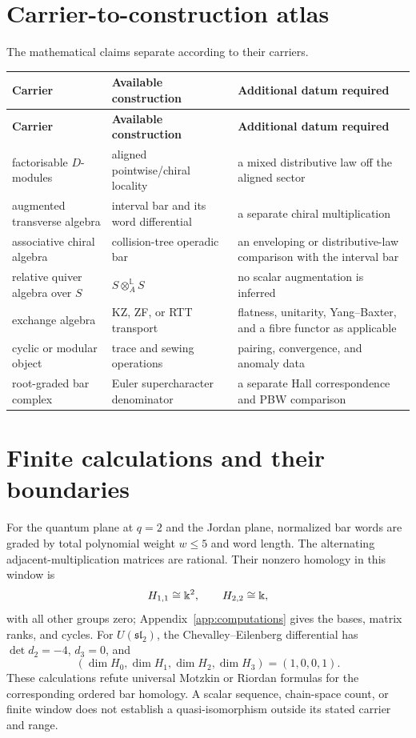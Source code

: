 \section{Carrier-to-construction atlas}
The mathematical claims separate according to their carriers.
\begin{longtable}{p{}p{}p{}}
\toprule
\textbf{Carrier} & \textbf{Available construction} & \textbf{Additional datum required}\\
\midrule
\endfirsthead
\toprule
\textbf{Carrier} & \textbf{Available construction} & \textbf{Additional datum required}\\
\midrule
\endhead
factorisable \(D\)-modules & aligned pointwise/chiral locality & a mixed distributive law off the aligned sector\\
augmented transverse algebra & interval bar and its word differential & a separate chiral multiplication\\
associative chiral algebra & collision-tree operadic bar & an enveloping or distributive-law comparison with the interval bar\\
relative quiver algebra over \(S\) & \(S\otimes_A^{\mathbb L}S\) & no scalar augmentation is inferred\\
exchange algebra & KZ, ZF, or RTT transport & flatness, unitarity, Yang--Baxter, and a fibre functor as applicable\\
cyclic or modular object & trace and sewing operations & pairing, convergence, and anomaly data\\
root-graded bar complex & Euler supercharacter denominator & a separate Hall correspondence and PBW comparison\\
\bottomrule
\end{longtable}

\section{Finite calculations and their boundaries}
For the quantum plane at \(q=2\) and the Jordan plane, normalized bar
words are graded by total polynomial weight \(w\leq5\) and word length.
The alternating adjacent-multiplication matrices are rational.  Their
nonzero homology in this window is
\[
 H_{1,1}\cong\Bbbk^2,\qquad H_{2,2}\cong\Bbbk,
\]
with all other groups zero; Appendix~\ref{app:computations} gives the
bases, matrix ranks, and cycles.  For \(U(\mathfrak{sl}_2)\), the
Chevalley--Eilenberg differential has \(\det d_2=-4\), \(d_3=0\), and
\[
(\dim H_0,\dim H_1,\dim H_2,\dim H_3)=(1,0,0,1).
\]
These calculations refute universal Motzkin or Riordan formulas for the
corresponding ordered bar homology.  A scalar sequence, chain-space count,
or finite window does not establish a quasi-isomorphism outside its stated
carrier and range.


